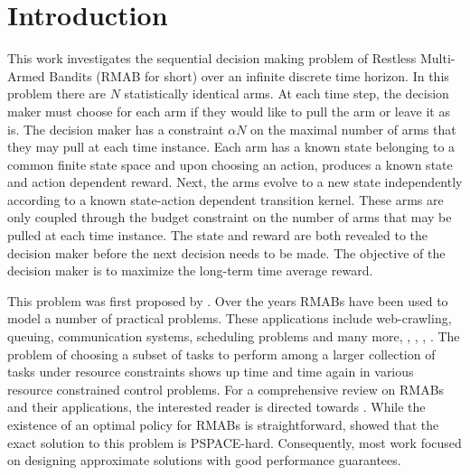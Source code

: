 \section{Introduction}
This work investigates the sequential decision making problem of Restless Multi-Armed Bandits (RMAB for short) over an infinite discrete time horizon. In this problem there are $N$ statistically identical arms. At each time step, the decision maker must choose for each arm if they would like to pull the arm or leave it as is. The decision maker has a constraint $\alpha N$ on the maximal number of arms that they may pull at each time instance. Each arm has a known state belonging to a common finite state space and upon choosing an action, produces a known state and action dependent reward. Next, the arms evolve to a new state independently according to a known state-action dependent transition kernel. These arms are only coupled through the budget constraint on the number of arms that may be pulled at each time instance. The state and reward are both revealed to the decision maker before the next decision needs to be made. The objective of the decision maker is to maximize the long-term time average reward.

This problem was first proposed by \citet{Wh88}. Over the years RMABs have been used to model a number of practical problems. These applications include web-crawling, queuing, communication systems, scheduling problems and many more, \citep{veatch1996scheduling}, \citep{dance2019optimal}, \citep{nino2002dynamic}, \citep{MearaWebcrawl01}. The problem of choosing a subset of tasks to perform among a larger collection of tasks under resource constraints shows up time and time again in various resource constrained control problems. For a comprehensive review on RMABs and their applications, the interested reader is directed towards \citet{NinoMora23}. While the existence of an optimal policy for RMABs is straightforward, \citet{PT99} showed that the exact solution to this problem is PSPACE-hard. Consequently, most work focused on designing approximate solutions with good performance guarantees. 

